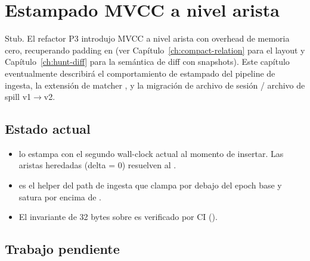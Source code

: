 \chapter{Estampado MVCC a nivel arista}
\label{ch:mvcc}

\begin{note}
Stub. El refactor P3 introdujo MVCC a nivel arista con overhead
de memoria cero, recuperando padding en \Compact{}
(ver Capítulo~\ref{ch:compact-relation} para el layout y
Capítulo~\ref{ch:hunt-diff} para la semántica de diff con
snapshots). Este capítulo eventualmente describirá el
comportamiento de estampado del pipeline de ingesta, la
extensión de matcher , y la
migración de archivo de sesión / archivo de spill v1$\to$v2.
\end{note}

\section{Estado actual}

\begin{itemize}
    \item {} lo
        estampa  con el segundo
        wall-clock actual al momento de insertar. Las aristas
        heredadas (delta = 0) resuelven al
        .
    \item {} es el helper del path
        de ingesta que clampa por debajo del epoch base y satura
        por encima de .
    \item El invariante de 32 bytes sobre \Compact{} es
        verificado por CI
        ().
\end{itemize}

\section{Trabajo pendiente}

